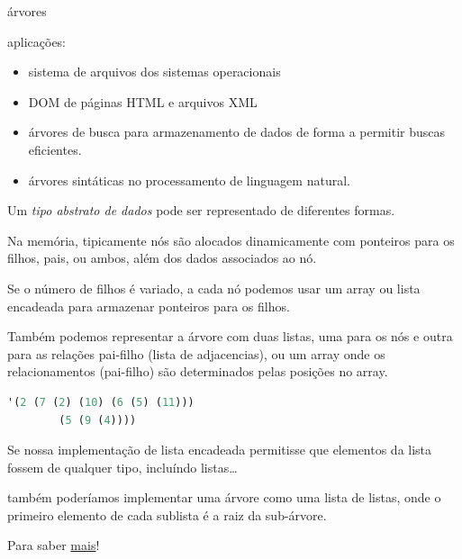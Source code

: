 \documentclass{beamer}
\begin{document}
\begin{frame}{árvores}
  \framebreak

  aplicações:

  \begin{itemize}
  \item sistema de arquivos dos sistemas operacionais
  \item DOM de páginas HTML e arquivos XML
  \item árvores de busca para armazenamento de dados de forma a
    permitir buscas eficientes.
  \item árvores sintáticas no processamento de linguagem natural.
  \end{itemize}

  \framebreak

  Um \emph{tipo abstrato de dados} pode ser representado de diferentes
  formas.

  Na memória, tipicamente nós são alocados dinamicamente com ponteiros
  para os filhos, pais, ou ambos, além dos dados associados ao nó.

  Se o número de filhos é variado, a cada nó podemos usar um array ou
  lista encadeada para armazenar ponteiros para os filhos.

  Também podemos representar a árvore com duas listas, uma para os nós
  e outra para as relações pai-filho (lista de adjacencias), ou um
  array onde os relacionamentos (pai-filho) são determinados pelas
  posições no array.

  \framebreak

  \begin{lstlisting}[style=code,language=lisp]
    '(2 (7 (2) (10) (6 (5) (11))) 
        (5 (9 (4))))
  \end{lstlisting}

  Se nossa implementação de lista encadeada permitisse que elementos
  da lista fossem de qualquer tipo, incluíndo listas\ldots

  também poderíamos implementar uma árvore como uma lista de listas,
  onde o primeiro elemento de cada sublista é a raiz da sub-árvore.

  Para saber \href{https://en.wikipedia.org/wiki/Tree_(data_structure)}{mais}!

\end{frame}
\end{document}
